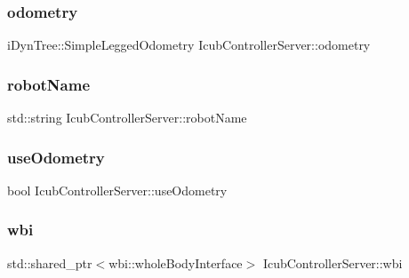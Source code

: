 \subsubsection{\texorpdfstring{odometry}{odometry}}
{\footnotesize\ttfamily i\+Dyn\+Tree\+::\+Simple\+Legged\+Odometry Icub\+Controller\+Server\+::odometry\hspace{0.3cm}{\ttfamily [private]}}

\hypertarget{classIcubControllerServer_a041d6687258c36677914b1d15f18e153}{}\label{classIcubControllerServer_a041d6687258c36677914b1d15f18e153} 
\subsubsection{\texorpdfstring{robot\+Name}{robotName}}
{\footnotesize\ttfamily std\+::string Icub\+Controller\+Server\+::robot\+Name\hspace{0.3cm}{\ttfamily [private]}}

\hypertarget{classIcubControllerServer_adc410f503b14ed288c01e877ac405114}{}\label{classIcubControllerServer_adc410f503b14ed288c01e877ac405114} 
\subsubsection{\texorpdfstring{use\+Odometry}{useOdometry}}
{\footnotesize\ttfamily bool Icub\+Controller\+Server\+::use\+Odometry\hspace{0.3cm}{\ttfamily [private]}}

\hypertarget{classIcubControllerServer_ae8a89707675adb58bb3006bc085828b7}{}\label{classIcubControllerServer_ae8a89707675adb58bb3006bc085828b7} 
\subsubsection{\texorpdfstring{wbi}{wbi}}
{\footnotesize\ttfamily std\+::shared\+\_\+ptr$<$wbi\+::whole\+Body\+Interface$>$ Icub\+Controller\+Server\+::wbi\hspace{0.3cm}{\ttfamily [private]}}

